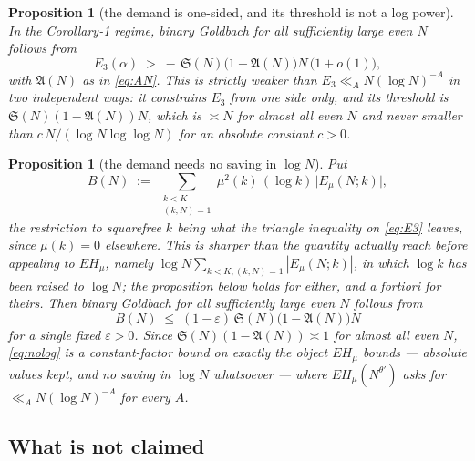 \documentclass[11pt,a4paper]{article}
\theoremstyle{plain}
\newtheorem{proposition}[theorem]{Proposition}
\theoremstyle{definition}
\theoremstyle{remark}
\renewcommand{\SS}{\mathfrak{S}}
\newcommand{\AAA}{\mathfrak{A}}
\newcommand{\Emu}{E_\mu}
\begin{document}
\begin{proposition}[the demand is one-sided, and its threshold is not
a log power]\label{prop:onesided}
In the Corollary-1 regime, binary Goldbach for all sufficiently large
even $N$ follows from
\begin{equation}\label{eq:onesided}
  E_3(\alpha)\;>\;-\,\SS(N)\bigl(1-\AAA(N)\bigr)N\,\bigl(1+o(1)\bigr),
\end{equation}
with $\AAA(N)$ as in \eqref{eq:AN}. This is strictly weaker than
$E_3\ll_A N(\log N)^{-A}$ in two independent ways: it constrains $E_3$
from one side only, and its threshold is $\SS(N)(1-\AAA(N))N$, which
is $\asymp N$ for almost all even $N$ and never smaller than
$c\,N/(\log N\log\log N)$ for an absolute constant $c>0$.
\end{proposition}

\begin{proposition}[the demand needs no saving in $\log N$]%
\label{prop:nolog}
Put
\begin{equation}\label{eq:Bsum}
  B(N)\;:=\;\sum_{\substack{k<K\\ (k,N)=1}}
     \mu^2(k)\,(\log k)\,\bigl|\Emu(N;k)\bigr|,
\end{equation}
the restriction to squarefree $k$ being what the triangle inequality
on \eqref{eq:E3} leaves, since $\mu(k)=0$ elsewhere. This is sharper than the quantity
\cite{HL} actually reach before appealing to $EH_\mu$, namely
$\log N\sum_{k<K,(k,N)=1}|\Emu(N;k)|$, in which $\log k$ has been
raised to $\log N$; the proposition below holds for either, and a
fortiori for theirs. Then binary Goldbach for all sufficiently large
even $N$ follows from
\begin{equation}\label{eq:nolog}
  B(N)\;\le\;(1-\varepsilon)\,\SS(N)\bigl(1-\AAA(N)\bigr)N
\end{equation}
for a single fixed $\varepsilon>0$. Since $\SS(N)(1-\AAA(N))\asymp1$
for almost all even $N$, \eqref{eq:nolog} is a \emph{constant-factor}
bound on exactly the object $EH_\mu$ bounds --- absolute values kept,
and no saving in $\log N$ whatsoever --- where $EH_\mu(N^{\theta'})$
asks for $\ll_A N(\log N)^{-A}$ for every $A$.
\end{proposition}

\subsection{What is not claimed}\label{sec:notclaimed}
\end{document}
